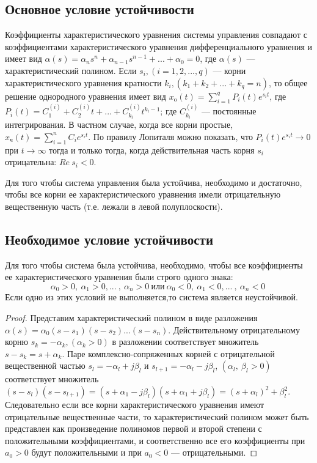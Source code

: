 \documentclass[../../TAU.tex]{subfiles}
\begin{document}
\subsection{Основное условие устойчивости}

    Коэффициенты характеристического уравнения системы управления совпадают с коэффициентами характеристического уравнения дифференциального уравнения и имеет вид
    $\alpha(s)=\alpha_ns^n+\alpha_{n-1}s^{n-1}+...+\alpha_0=0$, 
    где $\alpha(s)$ --- 
    характеристический полином. Если 
    $s_i, (i=1,2,...,q)$ ---
    корни характеристического уравнения кратности
    $k_i, (k_1+k_2+...+k_q=n)$, 
    то общее решение однородного уравнения имеет вид 
    $x_\text{o}(t)=\sum_{i=1}^q{P_i(t) e^{s_i t}}$, 
    где 
    $P_i(t)=C_1^{(i)}+C_2^{(i)} t+...+C_{k_i}^{(i)} t^{k_i-1}$; 
    где 
    $C_{k_i}^{(i)}$ --- постоянные   интегрирования. 
    В частном случае, когда все корни простые, 
    $x_\text{ч}(t)=\sum_{i=1}^nC_i e^{s_i t}$. 
    По правилу Лопиталя можно показать, что 
    $P_i(t) e^{s_i t}\rightarrow 0 $
    при 
    $t\rightarrow\infty$ 
    тогда и только тогда, когда действительная часть корня 
    $s_i$
    отрицательна: 
    $Re\ {s_i}<0$. 

     Для того чтобы система управления была устойчива, необходимо и достаточно, чтобы все корни ее характеристического уравнения имели отрицательную вещественную часть (т.е. лежали в левой полуплоскости). 

\subsection{Необходимое условие устойчивости}

    \cite[стр. 130]{voron} Для того чтобы система была устойчива, необходимо, чтобы все коэффициенты ее характеристического уравнения были строго одного знака: 
    $$
        \alpha_0>0,\ \alpha_1>0, ...\ ,\ \alpha_n>0\ \text{или}\ \alpha_0<0,\ \alpha_1<0, ...\ ,\ \alpha_n<0\ 
    $$
    Если одно из этих условий не выполняется,то система является неустойчивой.

    \begin{proof}
        Представим характеристический полином в виде разложения
        $\alpha(s)=\alpha_0(s-s_1) (s-s_2) ... (s-s_n)$.
        Действительному отрицательному корню
        $s_k = -\alpha_k, (\alpha_k>0)$
        в разложении соответствует множитель
        $s - s_k=s+\alpha_k$.
        Паре комплексно-сопряженных корней с отрицательной вещественной частью 
        $s_l=-\alpha_l+j \beta_l$ 
        и 
        $s_{l+1}=-\alpha_l-j \beta_l$, 
        $(\alpha_l,\ \beta_l > 0)$ 
        соответствует множитель 
        $(s-s_l) (s-s_{l+1}) = (s+\alpha_1 - j \beta_l) (s+\alpha_1 + j \beta_l) = (s+\alpha_l)^2+\beta_l^2$.
        Следовательно если все корни характеристического уравнения имеют отрицательные вещественные части, то характеристический полином может быть представлен как произведение полиномов первой и второй степени с положительными коэффициентами, и соответственно все его коэффициенты при 
        $a_0>0$ будут положительными и при 
        $a_0<0$ --- отрицательными.
    \end{proof}
\end{document}
